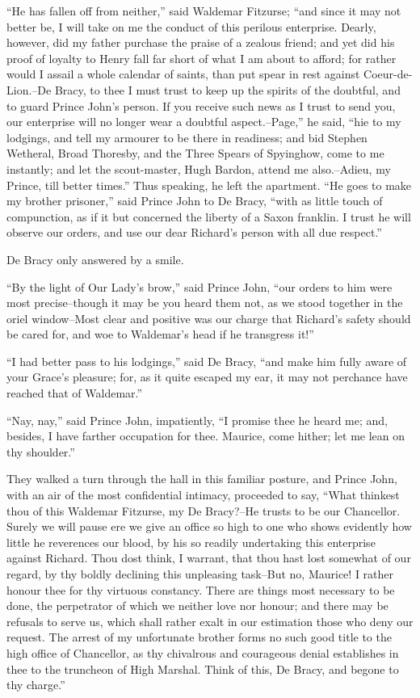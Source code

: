 ``He has fallen off from neither,'' said Waldemar Fitzurse; ``and since
it may not better be, I will take on me the conduct of this perilous
enterprise. Dearly, however, did my father purchase the praise of a
zealous friend; and yet did his proof of loyalty to Henry fall far short
of what I am about to afford; for rather would I assail a whole calendar
of saints, than put spear in rest against Coeur-de-Lion.--De Bracy, to
thee I must trust to keep up the spirits of the doubtful, and to guard
Prince John's person. If you receive such news as I trust to send you,
our enterprise will no longer wear a doubtful aspect.--Page,'' he said,
``hie to my lodgings, and tell my armourer to be there in readiness; and
bid Stephen Wetheral, Broad Thoresby, and the Three Spears of Spyinghow,
come to me instantly; and let the scout-master, Hugh Bardon, attend me
also.--Adieu, my Prince, till better times.'' Thus speaking, he left the
apartment. ``He goes to make my brother prisoner,'' said Prince John to
De Bracy, ``with as little touch of compunction, as if it but concerned
the liberty of a Saxon franklin. I trust he will observe our orders, and
use our dear Richard's person with all due respect.''

De Bracy only answered by a smile.

``By the light of Our Lady's brow,'' said Prince John, ``our orders to
him were most precise--though it may be you heard them not, as we stood
together in the oriel window--Most clear and positive was our charge
that Richard's safety should be cared for, and woe to Waldemar's head if
he transgress it!''

``I had better pass to his lodgings,'' said De Bracy, ``and make him
fully aware of your Grace's pleasure; for, as it quite escaped my ear,
it may not perchance have reached that of Waldemar.''

``Nay, nay,'' said Prince John, impatiently, ``I promise thee he heard
me; and, besides, I have farther occupation for thee. Maurice, come
hither; let me lean on thy shoulder.''

They walked a turn through the hall in this familiar posture, and Prince
John, with an air of the most confidential intimacy, proceeded to say,
``What thinkest thou of this Waldemar Fitzurse, my De Bracy?--He trusts
to be our Chancellor. Surely we will pause ere we give an office so high
to one who shows evidently how little he reverences our blood, by his so
readily undertaking this enterprise against Richard. Thou dost think, I
warrant, that thou hast lost somewhat of our regard, by thy boldly
declining this unpleasing task--But no, Maurice! I rather honour thee
for thy virtuous constancy. There are things most necessary to be done,
the perpetrator of which we neither love nor honour; and there may be
refusals to serve us, which shall rather exalt in our estimation those
who deny our request. The arrest of my unfortunate brother forms no such
good title to the high office of Chancellor, as thy chivalrous and
courageous denial establishes in thee to the truncheon of High Marshal.
Think of this, De Bracy, and begone to thy charge.''


